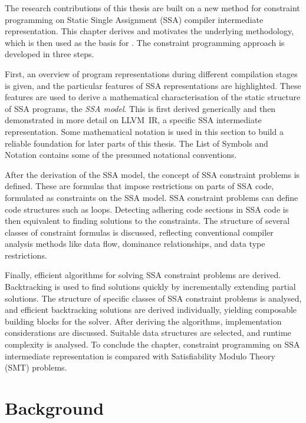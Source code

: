 
    The research contributions of this thesis are built on a new method for
    constraint programming on Static Single Assignment (SSA) compiler
    intermediate representation.
    This chapter derives and motivates the underlying methodology, which is
    then used as the basis for
    .
    The constraint programming approach is developed in three steps.

    First, an overview of program representations during different compilation
    stages is given, and the particular features of SSA representations are
    highlighted.
    These features are used to derive a mathematical characterisation of
    the static structure of SSA programs, the {\it SSA model}.
    This is first derived generically and then demonstrated
    in more detail on \mbox{LLVM IR}, a specific SSA intermediate
    representation.
    Some mathematical notation is used in this section to build a reliable
    foundation for later parts of this thesis.
    The List of Symbols and Notation contains some of the presumed notational
    conventions.

    After the derivation of the SSA model, the concept of SSA constraint
    problems is defined.
    These are formulas that impose restrictions on parts of SSA code,
    formulated as constraints on the SSA model.
    SSA constraint problems can define code structures such as loops.
    Detecting adhering code sections in SSA code is then equivalent to finding
    solutions to the constraints.
    The structure of several classes of constraint formulas is discussed,
    reflecting conventional compiler analysis methods like data flow,
    dominance relationships, and data type restrictions.

    Finally, efficient algorithms for solving SSA constraint problems are
    derived.
    Backtracking is used to find solutions quickly by incrementally extending
    partial solutions.
    The structure of specific classes of SSA constraint problems is analysed,
    and efficient backtracking solutions are derived individually, yielding
    composable building blocks for the solver.
    After deriving the algorithms, implementation considerations are
    discussed.
    Suitable data structures are selected, and runtime complexity is analysed.
    To conclude the chapter, constraint programming on SSA intermediate
    representation is compared with Satisfiability Modulo Theory (SMT) problems.

\section{Background}


